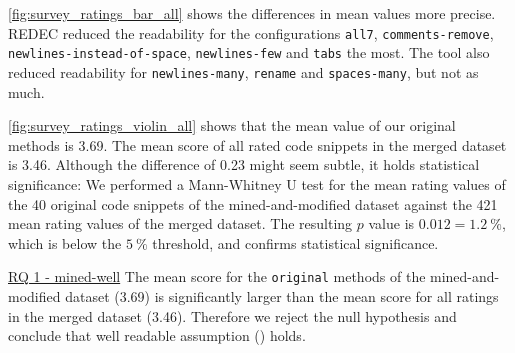 \documentclass[%
class=scrreprt,
chapterprefix=false,%
open=right,%
twoside=false,%
paper=a4,%
logofile={Logo\_zentral\_farbig\_EN.png},%
thesistype=master,%
UKenglish,%
]{se2thesis}
\theoremstyle{definition}
\newcommand{\numMerged}{421\xspace}
\newcommand{\rdh}{REDEC\xspace}
\begin{document}
	\begin{sloppypar}
	\autoref{fig:survey_ratings_bar_all} shows the differences in mean values more precise. \rdh reduced the readability for the configurations \texttt{all7}, \texttt{comments-remove}, \texttt{newlines-instead-of-space}, \texttt{newlines-few} and \texttt{tabs} the most. The tool also reduced readability for \texttt{newlines-many}, \texttt{rename} and \texttt{spaces-many}, but not as much.
	\end{sloppypar}

	\autoref{fig:survey_ratings_violin_all} shows that the mean value of our original methods is 3.69. The mean score of all rated code snippets in the merged dataset is 3.46. Although the difference of 0.23 might seem subtle, it holds statistical significance:
	We performed a Mann-Whitney U test for the mean rating values of the 40 original code snippets of the mined-and-modified dataset against the \numMerged mean rating values of the merged dataset. The resulting $p$ value is $0.012=1.2~\%$, which is below the $5~\%$ threshold, and confirms statistical significance.
	

	\begin{summary}{\hyperref[mined-well]{RQ 1 - mined-well}}
		The mean score for the \texttt{original} methods of the mined-and-modified dataset (3.69) is significantly larger than the mean score for all ratings in the merged dataset (3.46). Therefore we reject the null hypothesis and conclude that well readable assumption () holds.
	\end{summary}
	
\end{document}
